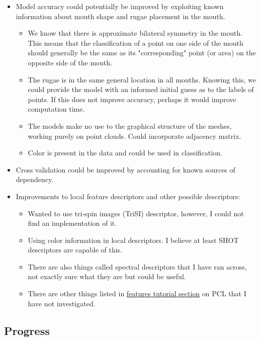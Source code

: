 \documentclass[11pt]{article}
\theoremstyle{definition}
\begin{document}
\begin{itemize}
    \item Model accuracy could potentially be improved by exploiting known information about mouth shape and rugae placement in the mouth. 
    \begin{itemize}
        \item We know that there is approximate bilateral symmetry in the mouth. This means that the classification of a point on one side of the mouth should generally be the same as its "corresponding" point (or area) on the opposite side of the mouth. 
        \item The rugae is in the same general location in all mouths. Knowing this, we could provide the model with an informed initial guess as to the labels of points. If this does not improve accuracy, perhaps it would improve computation time.
        \item The models make no use to the graphical structure of the meshes, working purely on point clouds. Could incorporate adjacency matrix.
        \item Color is present in the data and could be used in classification.
    \end{itemize}
    \item Cross validation could be improved by accounting for known sources of dependency.
    \item Improvements to local feature descriptors and other possible descriptors:
    \begin{itemize}
        \item Wanted to use tri-spin images (TriSI) descriptor, however, I could not find an implementation of it.
        \item Using color information in local descriptors. I believe at least SHOT descriptors are capable of this.
        \item There are also things called spectral descriptors that I have ran across, not exactly sure what they are but could be useful.
        \item There are other things listed in \href{https://pcl.readthedocs.io/projects/tutorials/en/master/#features}{features tutorial section} on PCL that I have not investigated.
    \end{itemize}
\end{itemize}

\subsection{Progress}
\end{document}
